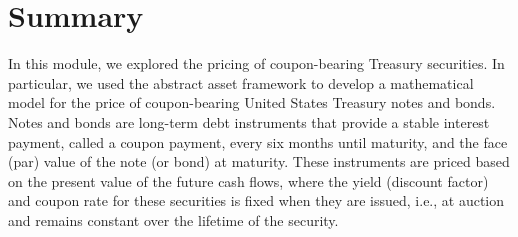 \documentclass[11pt]{article}
\theoremstyle{definition}
\begin{document}
\section*{Summary}
In this module, we explored the pricing of coupon-bearing Treasury securities.
In particular, we used the abstract asset framework to develop a mathematical model for the price of coupon-bearing United States Treasury notes and bonds.
Notes and bonds are long-term debt instruments that provide a stable interest payment, called a coupon payment, every six months until maturity, and the face (par) value of the note (or bond) at maturity.
These instruments are priced based on the present value of the future cash flows, where the yield (discount factor) and coupon rate for these securities is fixed when they are issued, i.e., at auction and remains constant over the lifetime of the security.



\clearpage
\printindex
\end{document}

